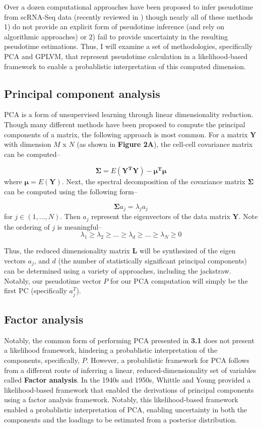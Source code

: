 \documentclass[english, 11pt]{article}\usepackage[]{graphicx}\usepackage[]{color}
\begin{document}
Over a dozen computational approaches have been proposed to infer pseudotime from scRNA-Seq data (recently reviewed in \cite{cannoodt2016computational}) though nearly all of these methods 1) do not provide an explicit form of pseudotime inference (and rely on algorithmic approaches) or 2) fail to provide uncertainty in the resulting pseudotime estimations. Thus, I will examine a set of methodologies, specifically PCA and GPLVM, that represent pseudotime calculation in a likelihood-based framework to enable a probablistic interpretation of this computed dimension.


\subsection{Principal component analysis}

PCA is a form of unsupervised learning through linear dimensionality reduction. Though many different methods have been proposed to compute the principal components of a matrix, the following approach is most common. For a matrix $\mathbf{Y}$ with dimension $M$ x $N$  (as shown in \textbf{Figure 2A}), the cell-cell covariance matrix can be computed--

$$ \mathbf{\Sigma} = E(\mathbf{Y^{T}Y}) - \mathbf{\mu^T\mu}$$
where $\mathbf{\mu} = E(\mathbf{Y})$. Next, the spectral decomposition of the covariance matrix $\mathbf{\Sigma}$ can be computed using the following form--

$$\mathbf{\Sigma} a_j = \lambda_j a_j$$
for $j \in (1, ..., N)$. Then $a_j$ represent the eigenvectors of the data matrix $\mathbf{Y}$. Note the ordering of $j$ is meaningful-- 
$$ \lambda_1 \geq \lambda_2 \geq ... \geq \lambda_d \geq ... \geq \lambda_N \geq 0$$


\noindent Thus, the reduced dimensionality matrix $\mathbf{L}$ will be synthesized of the eigen vectors $a_j$, and $d$ (the number of statistically significant principal components) can be determined using a variety of approaches, including the jackstraw. \cite{chung2015statistical} Notably, our pseudotime vector $P$ for our PCA computation will simply be the first PC (specifically $a_j^T$). 
 
 
\subsection{Factor analysis}

Notably, the common form of performing PCA presented in \textbf{3.1} does not present a likelihood framework, hindering a probablistic interpretation of the components, specifically, $P$. However, a probablistic framework for PCA follows from a different route of inferring a linear, reduced-dimensionality set of variables called \textbf{Factor analysis}. \newline \newline In the 1940s and 1950s, Whittle \cite{whittle1952principal} and Young \cite{young1941maximum} provided a likelihood-based framework that enabled the derivations of principal components using a factor analysis framework. Notably, this likelihood-based framework enabled a probablistic interpretation of PCA, enabling uncertainty in both the components and the loadings to be estimated from a posterior distribution. 
\end{document}
